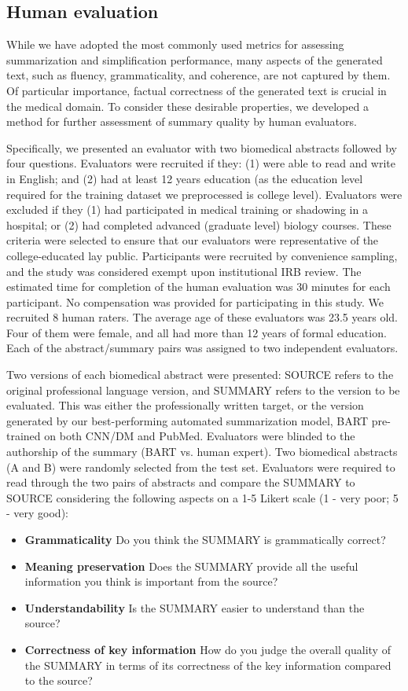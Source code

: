 \documentclass[letterpaper, table]{article}
\begin{document}
\subsection{Human evaluation}
While we have adopted the most commonly used metrics for assessing summarization and simplification performance, many aspects of the generated text, such as fluency, grammaticality, and coherence, are not captured by them. Of particular importance, factual correctness of the generated text is crucial in the medical domain. To consider these desirable properties, we developed a method for further assessment of summary quality by human evaluators.


Specifically, we presented an evaluator with two biomedical abstracts followed by four questions. Evaluators were recruited if they: (1) were able to read and write in English; and (2) had at least 12 years education (as the education level required for the training dataset we preprocessed is college level). Evaluators were excluded if they (1) had participated in medical training or shadowing in a hospital; or (2) had completed advanced (graduate level) biology courses. These criteria were selected to ensure that our evaluators were representative of the college-educated lay public. Participants were recruited by convenience sampling, and the study was considered exempt upon institutional IRB review. The estimated time for completion of the human evaluation was 30 minutes for each participant. No compensation was provided for participating in this study.  We recruited 8 human raters.
The average age of these evaluators was 23.5 years old. Four of them were female, and all had more than 12 years of formal education. Each of the abstract/summary pairs was assigned to two independent evaluators.

Two versions of each biomedical abstract were presented: SOURCE refers to the original professional language version, and SUMMARY refers to the version to be evaluated. This was either the professionally written target, or the version generated by our best-performing automated summarization model, BART pre-trained on both CNN/DM and PubMed. Evaluators were blinded to the authorship of the summary (BART vs. human expert). Two biomedical abstracts (A and B) were randomly selected from the test set. Evaluators were required to read through the two pairs of abstracts and compare the SUMMARY to SOURCE considering the following aspects on a 1-5 Likert scale (1 - very poor; 5 - very good):
\begin{itemize}
\item \textbf{Grammaticality} Do you think the SUMMARY is grammatically correct?
\item \textbf{Meaning preservation} Does the SUMMARY provide all the useful information you think is important from the source?
\item \textbf{Understandability} Is the SUMMARY easier to understand than the source?
\item \textbf{Correctness of key information} How do you judge the overall quality of the SUMMARY in terms of its correctness of the key information compared to the source?
\end{itemize}
\end{document}
